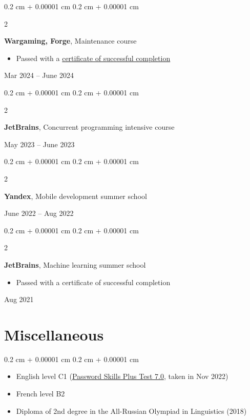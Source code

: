 \documentclass[10pt, letterpaper]{article}
\newenvironment{highlights}{
    \begin{itemize}[
        topsep=0.10 cm,
        parsep=0.10 cm,
        partopsep=0pt,
        itemsep=0pt,
        leftmargin=0.4 cm + 10pt
    ]
}{
    \end{itemize}
} %
\newenvironment{highlightsforbulletentries}{
    \begin{itemize}[
        topsep=0.10 cm,
        parsep=0.10 cm,
        partopsep=0pt,
        itemsep=0pt,
        leftmargin=10pt
    ]
}{
    \end{itemize}
} %
\newenvironment{onecolentry}{
    \begin{adjustwidth}{
        0.2 cm + 0.00001 cm
    }{
        0.2 cm + 0.00001 cm
    }
}{
    \end{adjustwidth}
} %
\newenvironment{twocolentry}[2][]{
    \onecolentry
    \def\secondColumn{#2}
    \setcolumnwidth{\fill, 4.5 cm}
    \begin{paracol}{2}
}{
    \switchcolumn \raggedleft \secondColumn
    \end{paracol}
    \endonecolentry
} %
\begin{document}
        \vspace{0.2 cm}

        \begin{twocolentry}{
            Mar 2024 – June 2024
        }
            \textbf{Wargaming, Forge}, Maintenance course
            \begin{highlights}
                \item Passed with a \href{https://drive.google.com/file/d/1p-x37Ugsu4JONwdZj5UdreDqEqGhXrW3/view?usp=sharing}{certificate of successful completion}
            \end{highlights}
        \end{twocolentry}


        \vspace{0.2 cm}

        \begin{twocolentry}{
            May 2023 – June 2023
        }
            \textbf{JetBrains}, Concurrent programming intensive course
        \end{twocolentry}


        \vspace{0.2 cm}

        \begin{twocolentry}{
            June 2022 – Aug 2022
        }
            \textbf{Yandex}, Mobile development summer school
        \end{twocolentry}


        \vspace{0.2 cm}

        \begin{twocolentry}{
            Aug 2021
        }
            \textbf{JetBrains}, Machine learning summer school
            \begin{highlights}
                \item Passed with a certificate of successful completion
            \end{highlights}
        \end{twocolentry}



    
    \section{Miscellaneous}

    \begin{onecolentry}
        \begin{highlightsforbulletentries}


        \item English level C1 (\href{https://drive.google.com/file/d/125A2hjAsJC6aRWulAMg6xOu1e6PfJCy9/view?usp=sharing}{Password Skills Plus Test 7.0}, taken in Nov 2022)

        \item French level B2

        \item Diploma of 2nd degree in the All-Russian Olympiad in Linguistics (2018)


        \end{highlightsforbulletentries}
    \end{onecolentry}
\end{document}
